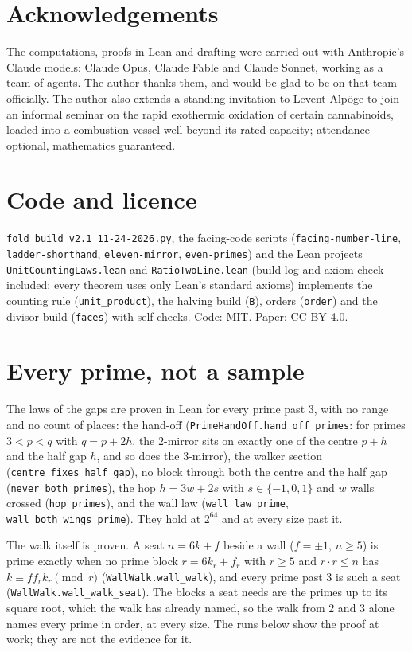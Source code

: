 \documentclass[11pt]{article}
\begin{document}
\section*{Acknowledgements}
The computations, proofs in Lean and drafting were carried out with Anthropic's Claude models: Claude Opus, Claude Fable and Claude Sonnet, working as a team of agents. The author thanks them, and would be glad to be on that team officially. The author also extends a standing invitation to Levent Alp\"oge to join an informal seminar on the rapid exothermic oxidation of certain cannabinoids, loaded into a combustion vessel well beyond its rated capacity; attendance optional, mathematics guaranteed.

\section*{Code and licence}
{\sloppy\texttt{fold\_build\_v2.1\_11-24-2026.py}, the facing-code scripts (\texttt{facing-number-line}, \texttt{ladder-shorthand}, \texttt{eleven-mirror}, \texttt{even-primes}) and the Lean projects \texttt{UnitCountingLaws.lean} and \texttt{RatioTwoLine.lean} (build log and axiom check included; every theorem uses only Lean's standard axioms) implements the counting rule (\texttt{unit\_product}), the halving build (\texttt{B}), orders (\texttt{order}) and the divisor build (\texttt{faces}) with self-checks. Code: MIT. Paper: CC BY 4.0.\par}

\section{Every prime, not a sample}
The laws of the gaps are proven in Lean for every prime past $3$, with no range and no count of places: the hand-off (\texttt{PrimeHandOff.hand\_off\_primes}: for primes $3<p<q$ with $q = p+2h$, the $2$-mirror sits on exactly one of the centre $p+h$ and the half gap $h$, and so does the $3$-mirror), the walker section (\texttt{centre\_fixes\_half\_gap}), no block through both the centre and the half gap (\texttt{never\_both\_primes}), the hop $h = 3w + 2s$ with $s\in\{-1,0,1\}$ and $w$ walls crossed (\texttt{hop\_primes}), and the wall law (\texttt{wall\_law\_prime}, \texttt{wall\_both\_wings\_prime}). They hold at $2^{64}$ and at every size past it.

The walk itself is proven. A seat $n = 6k+f$ beside a wall ($f=\pm1$, $n\ge5$) is prime exactly when no prime block $r = 6k_r+f_r$ with $r\ge5$ and $r\cdot r\le n$ has $k\equiv f f_r k_r \pmod r$ (\texttt{WallWalk.wall\_walk}), and every prime past $3$ is such a seat (\texttt{WallWalk.wall\_walk\_seat}). The blocks a seat needs are the primes up to its square root, which the walk has already named, so the walk from $2$ and $3$ alone names every prime in order, at every size. The runs below show the proof at work; they are not the evidence for it.
\end{document}
